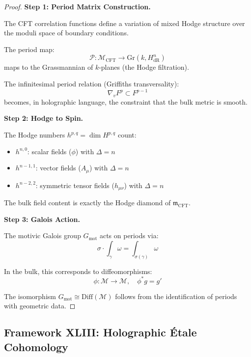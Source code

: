 \documentclass[12pt,a4paper]{article}
\begin{document}
\begin{proof}
\textbf{Step 1: Period Matrix Construction.}

The CFT correlation functions define a variation of mixed Hodge structure over the moduli space of boundary conditions.

The period map:
\begin{equation}
\mathcal{P}: \mathcal{M}_{\text{CFT}} \to \text{Gr}(k, H^n_{\text{dR}})
\end{equation}
maps to the Grassmannian of $k$-planes (the Hodge filtration).

The infinitesimal period relation (Griffiths transversality):
\begin{equation}
\nabla_v F^p \subset F^{p-1}
\end{equation}
becomes, in holographic language, the constraint that the bulk metric is smooth.

\textbf{Step 2: Hodge to Spin.}

The Hodge numbers $h^{p,q} = \dim H^{p,q}$ count:
\begin{itemize}
    \item $h^{n,0}$: scalar fields ($\phi$) with $\Delta = n$
    \item $h^{n-1,1}$: vector fields ($A_\mu$) with $\Delta = n$
    \item $h^{n-2,2}$: symmetric tensor fields ($h_{\mu\nu}$) with $\Delta = n$
\end{itemize}

The bulk field content is exactly the Hodge diamond of $\mathfrak{m}_{\text{CFT}}$.

\textbf{Step 3: Galois Action.}

The motivic Galois group $G_{\text{mot}}$ acts on periods via:
\begin{equation}
\sigma \cdot \int_\gamma \omega = \int_{\sigma(\gamma)} \omega
\end{equation}

In the bulk, this corresponds to diffeomorphisms:
\begin{equation}
\phi: \mathcal{M} \to \mathcal{M}, \quad \phi^* g = g'
\end{equation}

The isomorphism $G_{\text{mot}} \cong \text{Diff}(\mathcal{M})$ follows from the identification of periods with geometric data.
\end{proof}

\subsection{Framework XLIII: Holographic \'Etale Cohomology}
\end{document}

